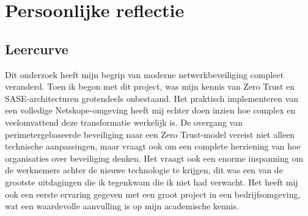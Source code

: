 \section{Persoonlijke reflectie}
\subsection{Leercurve}
Dit onderzoek heeft mijn begrip van moderne netwerkbeveiliging compleet veranderd. Toen ik begon met dit project, was mijn kennis van Zero Trust en SASE-architecturen grotendeels onbestaand. Het praktisch implementeren van een volledige Netskope-omgeving heeft mij echter doen inzien hoe complex en veelomvattend deze transformatie werkelijk is. De overgang van perimetergebaseerde beveiliging naar een Zero Trust-model vereist niet alleen technische aanpassingen, maar vraagt ook om een complete herziening van hoe organisaties over beveiliging denken. Het vraagt ook een enorme inspanning om de werknemers achter de nieuwe technologie te krijgen, dit was een van de grootste uitdagingen die ik tegenkwam die ik niet had verwacht. Het heeft mij ook een eerste ervaring gegeven met een groot project in een bedrijfsomgeving, wat een waardevolle aanvulling is op mijn academische kennis.
